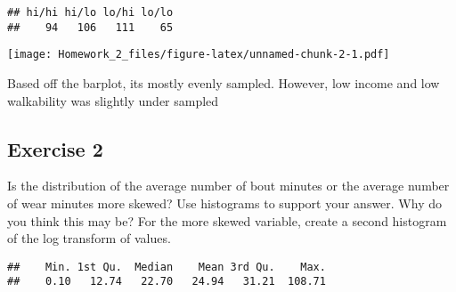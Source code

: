 \documentclass[]{article}
\newenvironment{Shaded}{\begin{snugshade}}{\end{snugshade}}
\newcommand{\KeywordTok}[1]{\textcolor[rgb]{0.13,0.29,0.53}{\textbf{#1}}}
\newcommand{\StringTok}[1]{\textcolor[rgb]{0.31,0.60,0.02}{#1}}
\newcommand{\OperatorTok}[1]{\textcolor[rgb]{0.81,0.36,0.00}{\textbf{#1}}}
\newcommand{\NormalTok}[1]{#1}
\begin{document}
\begin{Shaded}
\end{Shaded}

\begin{verbatim}
## hi/hi hi/lo lo/hi lo/lo 
##    94   106   111    65
\end{verbatim}

\begin{Shaded}
\end{Shaded}

\texttt{[image: Homework\_2\_files/figure-latex/unnamed-chunk-2-1.pdf]}

Based off the barplot, its mostly evenly sampled. However, low income
and low walkability was slightly under sampled

\subsection{Exercise 2}\label{exercise-2}

Is the distribution of the average number of bout minutes or the average
number of wear minutes more skewed? Use histograms to support your
answer. Why do you think this may be? For the more skewed variable,
create a second histogram of the log transform of values.

\begin{Shaded}
\end{Shaded}

\begin{verbatim}
##    Min. 1st Qu.  Median    Mean 3rd Qu.    Max. 
##    0.10   12.74   22.70   24.94   31.21  108.71
\end{verbatim}

\begin{Shaded}
\end{Shaded}
\end{document}
